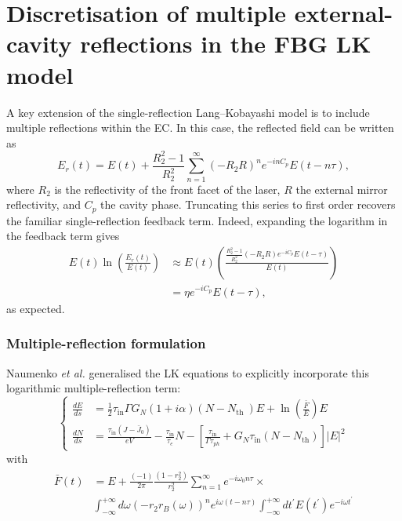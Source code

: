 \section{Discretisation of multiple external-cavity reflections in the FBG LK model}
\label{app:EC_multiple}
%
A key extension of the single-reflection Lang–Kobayashi model is to include multiple reflections within the EC. 
In this case, the reflected field can be written as
\begin{equation*}
    E_r(t) = E(t) + \frac{R_2^2 - 1}{R_2^2} \sum_{n=1}^\infty (-R_2 R)^n e^{-i n C_p} E(t-n \tau),
\end{equation*}
%
where $R_2$ is the reflectivity of the front facet of the laser, $R$ the external mirror reflectivity, and $C_p$ the cavity phase. 
Truncating this series to first order recovers the familiar single-reflection feedback term. 
Indeed, expanding the logarithm in the feedback term gives
%
\begin{equation*}
    \begin{aligned}
    E(t) \ln{\!\left(\frac{E_r(t)}{E(t)}\right)} 
    &\approx E(t)\!\left(\frac{\tfrac{R_2^2 - 1}{R_2^2}(-R_2 R)e^{-i C_p} E(t-\tau)}{E(t)}\right) \\
    &= \eta e^{-i C_p} E(t-\tau),
    \end{aligned}
\end{equation*}
%
as expected.
%
%
\subsubsection*{Multiple-reflection formulation}
%
Naumenko \textit{et al.} \cite{naumenko2003characteristics,naumenko2004slow} generalised the LK equations to explicitly incorporate this logarithmic multiple-reflection term:
%
\begin{equation*} 
    \left\{\begin{aligned}
         \frac{d E}{d s} &= \frac{1}{2} \tau_\text{in} \Gamma G_N(1+i \alpha)\left(N-N_{\text {th }}\right) E + \ln \left(\frac{\bar{F}}{E}\right) E \\ 
        \frac{d N}{d s} &= \frac{\tau_{\text{in}}\left(J-\bar{J}_0\right)}{e V}-\frac{\tau_\text{in}}{\tau_e} N-\left[\frac{\tau_\text{in}}{\Gamma \tau_{ph}}+G_N \tau_\text{in}\left(N-N_{\text{th}}\right)\right]|E|^2 
    \end{aligned}\right. 
\end{equation*}
%
with
%
\begin{gather} 
    \begin{aligned} 
    \bar{F}(t) &= E+\frac{(-1)}{2 \pi} \frac{\left(1-r_2^2\right)}{r_2^2} \sum_{n=1}^{\infty} e^{-i \omega_0 n \tau} \times \\ 
    &\int_{-\infty}^{+\infty} d \omega\left(-r_2 r_B(\omega)\right)^n e^{i \omega(t-n \tau)} \int_{-\infty}^{+\infty} d t^{\prime} E\left(t^{\prime}\right) e^{-i \omega t^{\prime}} 
    \end{aligned} 
\end{gather}
%
%
